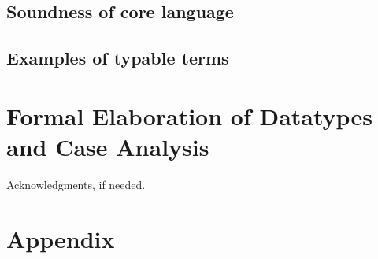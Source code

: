 \documentclass[preprint]{sigplanconf}
\theoremstyle{break}
\begin{document}
\subsection{Soundness of core language}

\subsection{Examples of typable terms}

\section{Formal Elaboration of Datatypes and Case Analysis}

\acks
Acknowledgments, if needed.

\nocite{*}  

\appendix
\section{Appendix}

\end{document}
